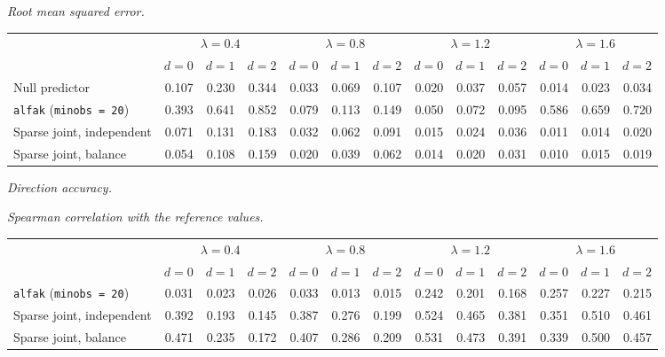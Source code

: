 \documentclass[11pt]{article}
\begin{document}
\noindent\textit{Root mean squared error.}
\begin{center}
\footnotesize
\setlength{\tabcolsep}{3pt}
\begin{tabular}{l*{12}{r}}
\toprule
 & \multicolumn{3}{c}{$\lambda=0.4$} & \multicolumn{3}{c}{$\lambda=0.8$} & \multicolumn{3}{c}{$\lambda=1.2$} & \multicolumn{3}{c}{$\lambda=1.6$} \\
\cmidrule(lr){2-4}\cmidrule(lr){5-7}\cmidrule(lr){8-10}\cmidrule(lr){11-13}
 & $d=0$ & $d=1$ & $d=2$ & $d=0$ & $d=1$ & $d=2$ & $d=0$ & $d=1$ & $d=2$ & $d=0$ & $d=1$ & $d=2$ \\
\midrule
Null predictor & 0.107 & 0.230 & 0.344 & 0.033 & 0.069 & 0.107 & 0.020 & 0.037 & 0.057 & 0.014 & 0.023 & 0.034 \\
\texttt{alfak} (\texttt{minobs = 20}) & 0.393 & 0.641 & 0.852 & 0.079 & 0.113 & 0.149 & 0.050 & 0.072 & 0.095 & 0.586 & 0.659 & 0.720 \\
Sparse joint, independent & 0.071 & 0.131 & 0.183 & 0.032 & 0.062 & 0.091 & 0.015 & 0.024 & 0.036 & 0.011 & 0.014 & 0.020 \\
Sparse joint, balance & 0.054 & 0.108 & 0.159 & 0.020 & 0.039 & 0.062 & 0.014 & 0.020 & 0.031 & 0.010 & 0.015 & 0.019 \\
\bottomrule
\end{tabular}
\end{center}

\noindent\textit{Direction accuracy.}


\noindent\textit{Spearman correlation with the reference values.}
\begin{center}
\footnotesize
\setlength{\tabcolsep}{3pt}
\begin{tabular}{l*{12}{r}}
\toprule
 & \multicolumn{3}{c}{$\lambda=0.4$} & \multicolumn{3}{c}{$\lambda=0.8$} & \multicolumn{3}{c}{$\lambda=1.2$} & \multicolumn{3}{c}{$\lambda=1.6$} \\
\cmidrule(lr){2-4}\cmidrule(lr){5-7}\cmidrule(lr){8-10}\cmidrule(lr){11-13}
 & $d=0$ & $d=1$ & $d=2$ & $d=0$ & $d=1$ & $d=2$ & $d=0$ & $d=1$ & $d=2$ & $d=0$ & $d=1$ & $d=2$ \\
\midrule
\texttt{alfak} (\texttt{minobs = 20}) & 0.031 & 0.023 & 0.026 & 0.033 & 0.013 & 0.015 & 0.242 & 0.201 & 0.168 & 0.257 & 0.227 & 0.215 \\
Sparse joint, independent & 0.392 & 0.193 & 0.145 & 0.387 & 0.276 & 0.199 & 0.524 & 0.465 & 0.381 & 0.351 & 0.510 & 0.461 \\
Sparse joint, balance & 0.471 & 0.235 & 0.172 & 0.407 & 0.286 & 0.209 & 0.531 & 0.473 & 0.391 & 0.339 & 0.500 & 0.457 \\
\bottomrule
\end{tabular}
\end{center}
\end{document}
